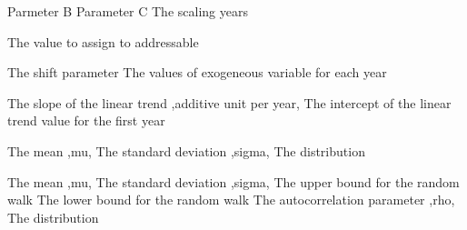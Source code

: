  {Parmeter B}
 {Parameter C}
 {The scaling years}
\par\textbf{}\par
{} {The value to assign to addressable}
\par\textbf{}\par
{} {The shift parameter}
 {The values of exogeneous variable for each year}
\par\textbf{}\par
{} {The slope of the linear trend ,additive unit per year,}
 {The intercept of the linear trend value for the first year}
\par\textbf{}\par
{} {The mean ,mu,}
 {The standard deviation ,sigma,}
 {The distribution}
\par\textbf{}\par
{} {The mean ,mu,}
 {The standard deviation ,sigma,}
 {The upper bound for the random walk}
 {The lower bound for the random walk}
 {The autocorrelation parameter ,rho,}
 {The distribution}
